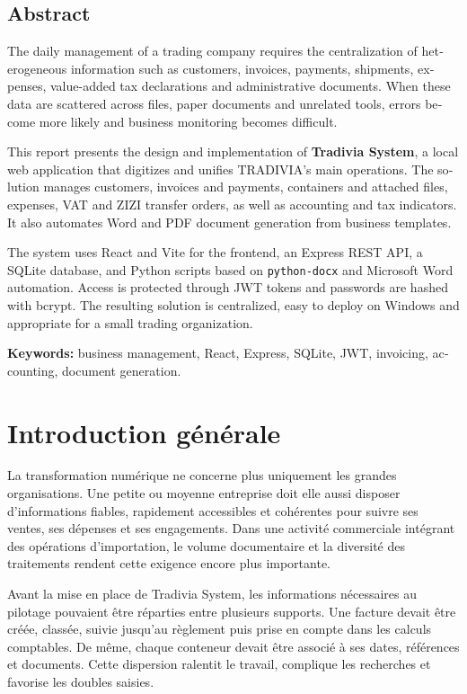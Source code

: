 \documentclass[12pt,a4paper,oneside]{report}
\newcommand{\code}[1]{\texttt{#1}}
\begin{document}
\begin{otherlanguage}{english}
\chapter*{Abstract}
The daily management of a trading company requires the centralization of heterogeneous information such as customers, invoices, payments, shipments, expenses, value-added tax declarations and administrative documents. When these data are scattered across files, paper documents and unrelated tools, errors become more likely and business monitoring becomes difficult.

This report presents the design and implementation of \textbf{Tradivia System}, a local web application that digitizes and unifies TRADIVIA's main operations. The solution manages customers, invoices and payments, containers and attached files, expenses, VAT and ZIZI transfer orders, as well as accounting and tax indicators. It also automates Word and PDF document generation from business templates.

The system uses React and Vite for the frontend, an Express REST API, a SQLite database, and Python scripts based on \code{python-docx} and Microsoft Word automation. Access is protected through JWT tokens and passwords are hashed with bcrypt. The resulting solution is centralized, easy to deploy on Windows and appropriate for a small trading organization.

\textbf{Keywords:} business management, React, Express, SQLite, JWT, invoicing, accounting, document generation.
\end{otherlanguage}

\chapter*{Introduction générale}
La transformation numérique ne concerne plus uniquement les grandes organisations. Une petite ou moyenne entreprise doit elle aussi disposer d'informations fiables, rapidement accessibles et cohérentes pour suivre ses ventes, ses dépenses et ses engagements. Dans une activité commerciale intégrant des opérations d'importation, le volume documentaire et la diversité des traitements rendent cette exigence encore plus importante.

Avant la mise en place de Tradivia System, les informations nécessaires au pilotage pouvaient être réparties entre plusieurs supports. Une facture devait être créée, classée, suivie jusqu'au règlement puis prise en compte dans les calculs comptables. De même, chaque conteneur devait être associé à ses dates, références et documents. Cette dispersion ralentit le travail, complique les recherches et favorise les doubles saisies.
\end{document}
